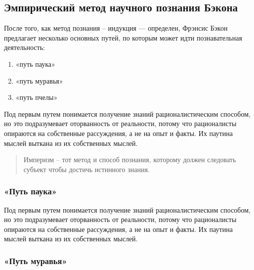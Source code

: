 \documentclass[
]{article}
\providecommand{\tightlist}{%
  \setlength{\itemsep}{0pt}\setlength{\parskip}{0pt}}
\begin{document}
\hypertarget{ux44dux43cux43fux438ux440ux438ux447ux435ux441ux43aux438ux439-ux43cux435ux442ux43eux434-ux43dux430ux443ux447ux43dux43eux433ux43e-ux43fux43eux437ux43dux430ux43dux438ux44f-ux431ux44dux43aux43eux43dux430}{%
\subsection{Эмпирический метод научного познания
Бэкона}\label{ux44dux43cux43fux438ux440ux438ux447ux435ux441ux43aux438ux439-ux43cux435ux442ux43eux434-ux43dux430ux443ux447ux43dux43eux433ux43e-ux43fux43eux437ux43dux430ux43dux438ux44f-ux431ux44dux43aux43eux43dux430}}

После того, как метод познания -- индукция --- определен, Фрэнсис Бэкон
предлагает несколько основных путей, по которым может идти
познавательная деятельность:

\begin{enumerate}
\def\labelenumi{\arabic{enumi}.}
\tightlist
\item
  «путь паука»
\item
  «путь муравья»
\item
  «путь пчелы»
\end{enumerate}

Под первым путем понимается получение знаний рационалистическим
способом, но это подразумевает оторванность от реальности, потому что
рационалисты опираются на собственные рассуждения, а не на опыт и факты.
Их паутина мыслей выткана из их собственных мыслей.

\begin{quote}
Империзм -- тот метод и способ познания, которому должен следовать
субъект чтобы достичь истинного знания.
\end{quote}

\hypertarget{ux43fux443ux442ux44c-ux43fux430ux443ux43aux430}{%
\subsubsection{«Путь
паука»}\label{ux43fux443ux442ux44c-ux43fux430ux443ux43aux430}}

Под первым путем понимается получение знаний рационалистическим
способом, но это подразумевает оторванность от реальности, потому что
рационалисты опираются на собственные рассуждения, а не на опыт и факты.
Их паутина мыслей выткана из их собственных мыслей.

\hypertarget{ux43fux443ux442ux44c-ux43cux443ux440ux430ux432ux44cux44f}{%
\subsubsection{«Путь
муравья»}\label{ux43fux443ux442ux44c-ux43cux443ux440ux430ux432ux44cux44f}}
\end{document}
